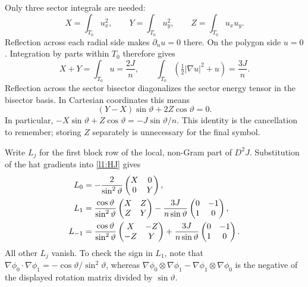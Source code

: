 Only three sector integrals are needed:
\[
 X=\int_{T_0}u_x^2,\qquad Y=\int_{T_0}u_y^2,
 \qquad Z=\int_{T_0}u_xu_y.
\]
Reflection across each radial side makes $\partial_nu=0$ there.
On the polygon side $u=0$. Integration by parts within $T_0$ therefore gives
\[
 X+Y=\int_{T_0}u=\frac{2J}{n},\qquad
 \int_{T_0}(\tfrac12|\nabla u|^2+u)=\frac{3J}{n}.
\]
Reflection across the sector bisector diagonalizes the sector energy tensor
in the bisector basis. In Cartesian coordinates this means
\begin{equation}
 (Y-X)\sin\vartheta+2Z\cos\vartheta=0.
 \label{l1:sector}
\end{equation}
In particular,
$-X\sin\vartheta+Z\cos\vartheta=-J\sin\vartheta/n$.
This identity is the cancellation to remember; storing $Z$ separately is
unnecessary for the final symbol.

Write $L_j$ for the first block row of the local, non-Gram part of $D^2J$.
Substitution of the hat gradients into \eqref{l1:HJ} gives
\begin{align}
 L_0&=-\frac{2}{\sin^2\vartheta}
          \begin{pmatrix}X&0\\0&Y\end{pmatrix},\notag\\
 L_1&=\frac{\cos\vartheta}{\sin^2\vartheta}
          \begin{pmatrix}X&Z\\Z&Y\end{pmatrix}
       -\frac{3J}{n\sin\vartheta}\begin{pmatrix}0&-1\\1&0\end{pmatrix},\notag\\
 L_{-1}&=\frac{\cos\vartheta}{\sin^2\vartheta}
          \begin{pmatrix}X&-Z\\-Z&Y\end{pmatrix}
       +\frac{3J}{n\sin\vartheta}\begin{pmatrix}0&-1\\1&0\end{pmatrix}.
 \label{l1:localblocks}
\end{align}
All other $L_j$ vanish. To check the sign in $L_1$, note that
$\nabla\phi_0\cdot\nabla\phi_1=-\cos\vartheta/\sin^2\vartheta$,
whereas
$\nabla\phi_0\otimes\nabla\phi_1-
 \nabla\phi_1\otimes\nabla\phi_0$
is the negative of the displayed rotation matrix divided by
$\sin\vartheta$.

